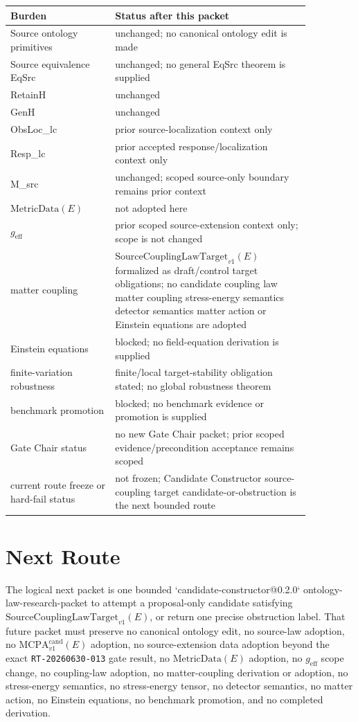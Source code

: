 \documentclass[11pt]{article}
\newcommand{\MetricData}{\mathrm{MetricData}}
\newcommand{\geff}{g_{\mathrm{eff}}}
\newcommand{\MCPA}{\mathrm{MCPA}^{\mathrm{cand}}_{v1}}
\newcommand{\SourceCoupTarget}{\mathrm{SourceCouplingLawTarget}_{v1}}
\begin{document}
\begin{longtable}{p{0.30\linewidth}p{0.56\linewidth}}
\toprule
Burden & Status after this packet \\
\midrule
Source ontology primitives & unchanged; no canonical ontology edit is made \\
Source equivalence EqSrc & unchanged; no general EqSrc theorem is supplied \\
RetainH & unchanged \\
GenH & unchanged \\
ObsLoc\_lc & prior source-localization context only \\
Resp\_lc & prior accepted response/localization context only \\
M\_src & unchanged; scoped source-only boundary remains prior context \\
\(\MetricData(E)\) & not adopted here \\
\(\geff\) & prior scoped source-extension context only; scope is not changed \\
matter coupling & \(\SourceCoupTarget(E)\) formalized as draft/control target obligations; no candidate coupling law matter coupling stress-energy semantics detector semantics matter action or Einstein equations are adopted \\
Einstein equations & blocked; no field-equation derivation is supplied \\
finite-variation robustness & finite/local target-stability obligation stated; no global robustness theorem \\
benchmark promotion & blocked; no benchmark evidence or promotion is supplied \\
Gate Chair status & no new Gate Chair packet; prior scoped evidence/precondition acceptance remains scoped \\
current route freeze or hard-fail status & not frozen; Candidate Constructor source-coupling target candidate-or-obstruction is the next bounded route \\
\bottomrule
\end{longtable}

\section{Next Route}

The logical next packet is one bounded `candidate-constructor@0.2.0`
ontology-law-research-packet to attempt a proposal-only candidate satisfying
\(\SourceCoupTarget(E)\), or return one precise obstruction label. That
future packet must preserve no canonical ontology edit, no source-law
adoption, no \(\MCPA(E)\) adoption, no source-extension data adoption beyond
the exact \texttt{RT-20260630-013} gate result, no \(\MetricData(E)\)
adoption, no \(\geff\) scope change, no coupling-law adoption, no
matter-coupling derivation or adoption, no stress-energy semantics, no
stress-energy tensor, no detector semantics, no matter action, no Einstein
equations, no benchmark promotion, and no completed derivation.
\end{document}
